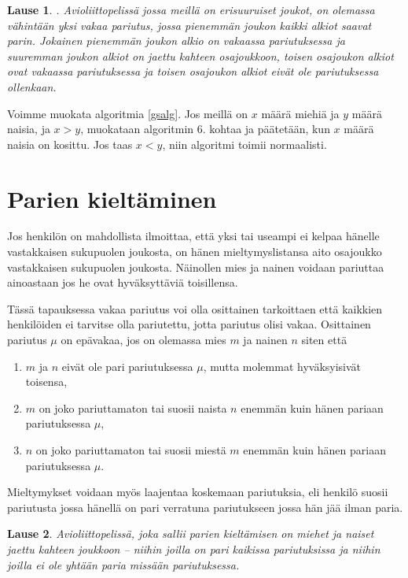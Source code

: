 \documentclass[finnish]{tktltiki2}
\newtheorem{lau}{Lause}
\theoremstyle{definition}
\theoremstyle{remark}
\begin{document}
\begin{lau}\cite[p. 26]{gusfield1989stable}.
Avioliittopelissä jossa meillä on erisuuruiset joukot, on olemassa vähintään yksi vakaa pariutus, jossa pienemmän joukon kaikki alkiot saavat parin. Jokainen pienemmän joukon alkio on vakaassa pariutuksessa ja suuremman joukon alkiot on jaettu kahteen osajoukkoon, toisen osajoukon alkiot ovat vakaassa pariutuksessa ja toisen osajoukon alkiot eivät ole pariutuksessa ollenkaan.
\end{lau}

Voimme muokata algoritmia \ref{gsalg}. Jos meillä on $x$ määrä miehiä ja $y$ määrä naisia, ja $x > y$, muokataan algoritmin 6. kohtaa ja päätetään, kun $x$ määrä naisia on kosittu. Jos taas $x < y$, niin algoritmi toimii normaalisti.


\section{Parien kieltäminen}
Jos henkilön on mahdollista ilmoittaa, että yksi tai useampi ei kelpaa hänelle vastakkaisen sukupuolen joukosta, on hänen mieltymyslistansa aito osajoukko vastakkaisen sukupuolen joukosta. Näinollen mies ja nainen voidaan pariuttaa ainoastaan jos he ovat hyväksyttäviä toisillensa.

Tässä tapauksessa vakaa pariutus voi olla osittainen tarkoittaen että kaikkien henkilöiden ei tarvitse olla pariutettu, jotta pariutus olisi vakaa. Osittainen pariutus $\mu$ on epävakaa, jos on olemassa mies $m$ ja nainen $n$ siten että
\begin{enumerate}
	\item $m$ ja $n$ eivät ole pari pariutuksessa $\mu$, mutta molemmat hyväksyisivät toisensa,
	\item $m$ on joko pariuttamaton tai suosii naista $n$ enemmän kuin hänen pariaan pariutuksessa $\mu$,
	\item $n$ on joko pariuttamaton tai suosii miestä $m$ enemmän kuin hänen pariaan pariutuksessa $\mu$.
\end{enumerate} 
Mieltymykset voidaan myös laajentaa koskemaan pariutuksia, eli henkilö suosii pariutusta jossa hänellä on pari verratuna pariutukseen jossa hän jää ilman paria.

\begin{lau}
Avioliittopelissä, joka sallii parien kieltämisen on miehet ja naiset jaettu kahteen joukkoon -- niihin joilla on pari kaikissa pariutuksissa ja niihin joilla ei ole yhtään paria missään pariutuksessa.
\end{lau}
\end{document}
